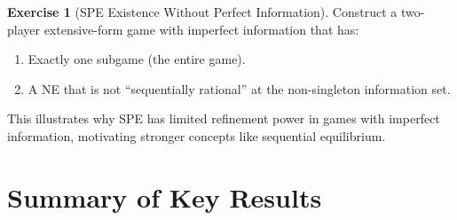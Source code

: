 \documentclass[11pt,a4paper]{article}
\theoremstyle{definition}
\newtheorem{exercise}{Exercise}[section]
\theoremstyle{plain}
\theoremstyle{remark}
\begin{document}
\begin{exercise}[SPE Existence Without Perfect Information]
\label{ex:spe_imperfect}
Construct a two-player extensive-form game with imperfect information that has:
\begin{enumerate}[nosep,label=(\alph*)]
    \item Exactly one subgame (the entire game).
    \item A NE that is not ``sequentially rational'' at the non-singleton information set.
\end{enumerate}
This illustrates why SPE has limited refinement power in games with imperfect information,
motivating stronger concepts like sequential equilibrium.
\end{exercise}

\section{Summary of Key Results}
\label{sec:summary}
\end{document}
